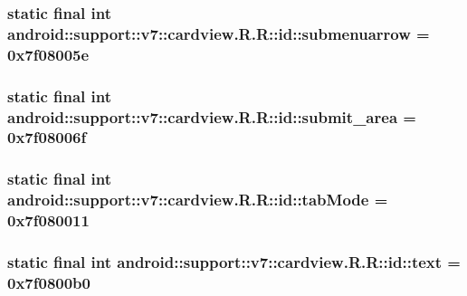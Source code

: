 \hypertarget{classandroid_1_1support_1_1v7_1_1cardview_1_1_r_1_1id_ccc5a31cc2f90fd2d87ff8ad31199d7e}{
\subsubsection[{submenuarrow}]{\setlength{\rightskip}{0pt plus 5cm}static final int android::support::v7::cardview.R.R::id::submenuarrow = 0x7f08005e}}
\label{classandroid_1_1support_1_1v7_1_1cardview_1_1_r_1_1id_ccc5a31cc2f90fd2d87ff8ad31199d7e}


\hypertarget{classandroid_1_1support_1_1v7_1_1cardview_1_1_r_1_1id_b350d6768583d9fadad3d36101bb7d81}{
\subsubsection[{submit\_\-area}]{\setlength{\rightskip}{0pt plus 5cm}static final int android::support::v7::cardview.R.R::id::submit\_\-area = 0x7f08006f}}
\label{classandroid_1_1support_1_1v7_1_1cardview_1_1_r_1_1id_b350d6768583d9fadad3d36101bb7d81}


\hypertarget{classandroid_1_1support_1_1v7_1_1cardview_1_1_r_1_1id_edd6beaad18d25e2c4eabae53021599f}{
\subsubsection[{tabMode}]{\setlength{\rightskip}{0pt plus 5cm}static final int android::support::v7::cardview.R.R::id::tabMode = 0x7f080011}}
\label{classandroid_1_1support_1_1v7_1_1cardview_1_1_r_1_1id_edd6beaad18d25e2c4eabae53021599f}


\hypertarget{classandroid_1_1support_1_1v7_1_1cardview_1_1_r_1_1id_24f87e4f1885c871174ab25c2edac96f}{
\subsubsection[{text}]{\setlength{\rightskip}{0pt plus 5cm}static final int android::support::v7::cardview.R.R::id::text = 0x7f0800b0}}
\label{classandroid_1_1support_1_1v7_1_1cardview_1_1_r_1_1id_24f87e4f1885c871174ab25c2edac96f}



